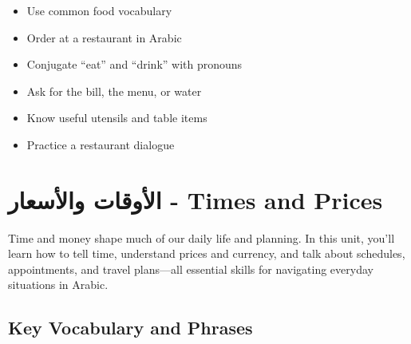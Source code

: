 \documentclass[
  a4paper,
  DIV=11,
  numbers=noendperiod]{scrartcl}
\providecommand{\tightlist}{%
  \setlength{\itemsep}{0pt}\setlength{\parskip}{0pt}}
\begin{document}
\begin{tcolorbox}[enhanced jigsaw, bottomrule=.15mm, arc=.35mm, colbacktitle=quarto-callout-note-color!10!white, opacityback=0, toptitle=1mm, title=\textcolor{quarto-callout-note-color}{\faInfo}\hspace{0.5em}{Review Goals}, colframe=quarto-callout-note-color-frame, opacitybacktitle=0.6, colback=white, coltitle=black, titlerule=0mm, left=2mm, toprule=.15mm, bottomtitle=1mm, rightrule=.15mm, leftrule=.75mm, breakable]

\begin{itemize}
\tightlist
\item[$\square$]
  Use common food vocabulary\\
\item[$\square$]
  Order at a restaurant in Arabic\\
\item[$\square$]
  Conjugate ``eat'' and ``drink'' with pronouns\\
\item[$\square$]
  Ask for the bill, the menu, or water\\
\item[$\square$]
  Know useful utensils and table items\\
\item[$\square$]
  Practice a restaurant dialogue
\end{itemize}

\end{tcolorbox}

\section{الأوقات والأسعار - Times and
Prices}\label{ux627ux644ux623ux648ux642ux627ux62a-ux648ux627ux644ux623ux633ux639ux627ux631---times-and-prices}

Time and money shape much of our daily life and planning. In this unit,
you'll learn how to tell time, understand prices and currency, and talk
about schedules, appointments, and travel plans---all essential skills
for navigating everyday situations in Arabic.

\subsection{Key Vocabulary and
Phrases}\label{key-vocabulary-and-phrases-4}
\end{document}
